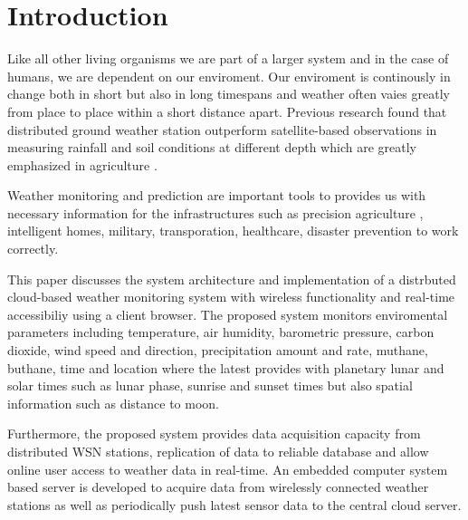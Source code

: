 \section{Introduction}
\label{sec:introduction}
Like all other living organisms we are part of a larger system and in the case of
humans, we are dependent on our enviroment. Our enviroment is continously in change
both in short but also in long timespans and weather often vaies greatly from
place to place within a short distance apart. Previous research found that
distributed ground weather station outperform satellite-based observations
in measuring rainfall and soil conditions at different depth which are greatly
emphasized in agriculture \cite{Mendelsohn2007}.

Weather monitoring and prediction are important tools to provides us with necessary information for the
infrastructures such as precision agriculture \cite{6878963}, intelligent homes,
military, transporation, healthcare, disaster prevention to work correctly.


This paper discusses the system architecture and implementation of a distrbuted cloud-based weather monitoring system with wireless functionality and
real-time accessibiliy using a client browser. The proposed system monitors enviromental parameters including
temperature, air humidity, barometric pressure, carbon dioxide, wind speed and direction, precipitation amount
and rate, muthane, buthane, time and location where the latest provides with planetary lunar and solar times such
as lunar phase, sunrise and sunset times but also spatial information such as distance to moon.

Furthermore, the proposed system provides data acquisition capacity from distributed WSN stations,
replication of data to reliable database and allow online user access to weather data in real-time.
An embedded computer system based server is developed to acquire data from wirelessly connected weather
stations as well as periodically push latest sensor data to the central cloud server.
